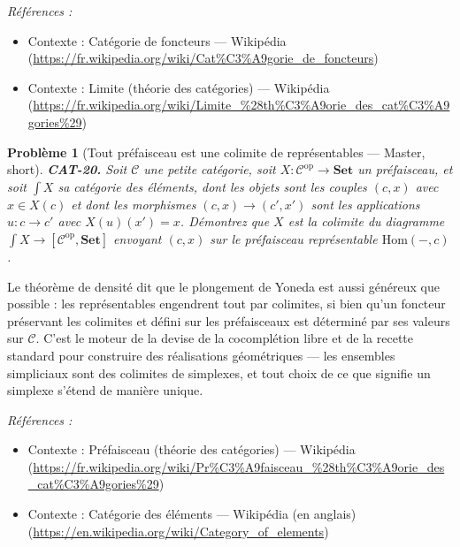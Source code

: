 \documentclass[11pt]{article}
\newtheorem{problem}{Problème}
\newenvironment{refs}{\par\small\noindent\emph{Références :}\begin{itemize}\setlength\itemsep{0pt}}{\end{itemize}\normalsize}
\begin{document}
\begin{refs}
\item Contexte : Catégorie de foncteurs --- Wikipédia (\url{https://fr.wikipedia.org/wiki/Cat%C3%A9gorie_de_foncteurs})
\item Contexte : Limite (théorie des catégories) --- Wikipédia (\url{https://fr.wikipedia.org/wiki/Limite_%28th%C3%A9orie_des_cat%C3%A9gories%29})
\end{refs}

\bigskip

\begin{problem}[{Tout préfaisceau est une colimite de représentables --- Master, short}]
\textbf{CAT-20.} Soit $ \mathcal{C} $ une petite catégorie, soit
$ X\colon \mathcal{C}^{\mathrm{op}} \to \mathbf{Set} $ un préfaisceau, et soit $ \int X $ sa
\textit{catégorie des éléments}, dont les objets sont les couples $ (c, x) $ avec $ x \in X(c) $
et dont les morphismes $ (c, x) \to (c', x') $ sont les applications $ u\colon c \to c' $ avec
$ X(u)(x') = x $. Démontrez que $ X $ est la colimite du diagramme
$ \int X \to [\mathcal{C}^{\mathrm{op}}, \mathbf{Set}] $ envoyant $ (c, x) $ sur le
préfaisceau représentable $ \mathrm{Hom}(-, c) $.
\end{problem}

\noindent Le théorème de densité dit que le plongement de Yoneda est aussi généreux que
possible : les représentables engendrent tout par colimites, si bien qu'un foncteur préservant les
colimites et défini sur les préfaisceaux est déterminé par ses valeurs sur $ \mathcal{C} $.
C'est le moteur de la devise de la \og{} cocomplétion libre \fg{} et de la recette standard pour construire
des réalisations géométriques --- les ensembles simpliciaux sont des colimites de simplexes, et tout
choix de \og{} ce que signifie un simplexe \fg{} s'étend de manière unique.

\begin{refs}
\item Contexte : Préfaisceau (théorie des catégories) --- Wikipédia (\url{https://fr.wikipedia.org/wiki/Pr%C3%A9faisceau_%28th%C3%A9orie_des_cat%C3%A9gories%29})
\item Contexte : Catégorie des éléments --- Wikipédia (en anglais) (\url{https://en.wikipedia.org/wiki/Category_of_elements})
\end{refs}

\bigskip
\end{document}
